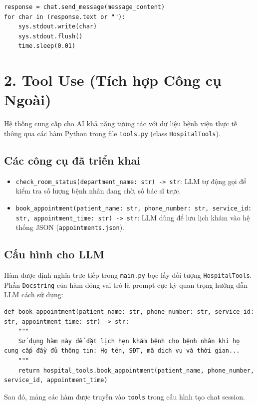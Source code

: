 \documentclass[12pt]{article}
\begin{document}
\begin{mdframed}[backgroundcolor=gray!10]
\begin{verbatim}
response = chat.send_message(message_content)
for char in (response.text or ""):
    sys.stdout.write(char)
    sys.stdout.flush()
    time.sleep(0.01)
\end{verbatim}
\end{mdframed}

\section{2. Tool Use (Tích hợp Công cụ Ngoài)}
Hệ thống cung cấp cho AI khả năng tương tác với dữ liệu bệnh viện thực tế thông qua các hàm Python trong file \texttt{tools.py} (class \texttt{HospitalTools}).

\subsection{Các công cụ đã triển khai}
\begin{itemize}
    \item \texttt{check\_room\_status(department\_name: str) -> str}: LLM tự động gọi để kiểm tra số lượng bệnh nhân đang chờ, số bác sĩ trực.
    \item \texttt{book\_appointment(patient\_name: str, phone\_number: str, service\_id: str, appointment\_time: str) -> str}: LLM dùng để lưu lịch khám vào hệ thống JSON (\texttt{appointments.json}).
\end{itemize}

\subsection{Cấu hình cho LLM}
Hàm được định nghĩa trực tiếp trong \texttt{main.py} bọc lấy đối tượng \texttt{HospitalTools}. Phần \texttt{Docstring} của hàm đóng vai trò là prompt cực kỳ quan trọng hướng dẫn LLM cách sử dụng:

\begin{mdframed}[backgroundcolor=gray!10]
\begin{verbatim}
def book_appointment(patient_name: str, phone_number: str, service_id: str, appointment_time: str) -> str:
    """
    Sử dụng hàm này để đặt lịch hẹn khám bệnh cho bệnh nhân khi họ cung cấp đầy đủ thông tin: Họ tên, SĐT, mã dịch vụ và thời gian...
    """
    return hospital_tools.book_appointment(patient_name, phone_number, service_id, appointment_time)
\end{verbatim}
\end{mdframed}
Sau đó, mảng các hàm được truyền vào \texttt{tools} trong cấu hình tạo chat session.
\end{document}
